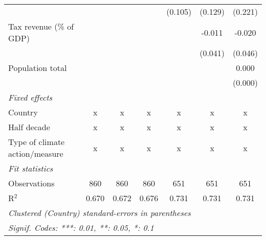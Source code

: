\begin{tabular}{lcccccc}
                                                          &         &              &                & (0.105)        & (0.129)        & (0.221)\\   
   Tax revenue (\% of GDP)                                &         &              &                &                & -0.011         & -0.020\\   
                                                          &         &              &                &                & (0.041)        & (0.046)\\   
   Population total                                       &         &              &                &                &                & 0.000\\   
                                                          &         &              &                &                &                & (0.000)\\   
   \emph{Fixed effects}\\
   Country                                                & x       & x            & x              & x              & x              & x\\  
   Half decade                                            & x       & x            & x              & x              & x              & x\\  
   Type of climate action/measure                         & x       & x            & x              & x              & x              & x\\  
   \midrule \emph{Fit statistics}\\
   Observations                                           & 860     & 860          & 860            & 651            & 651            & 651\\  
   R$^2$                                                  & 0.670   & 0.672        & 0.676          & 0.731          & 0.731          & 0.731\\  
   \midrule
   \multicolumn{7}{l}{\emph{Clustered (Country) standard-errors in parentheses}}\\
   \multicolumn{7}{l}{\emph{Signif. Codes: ***: 0.01, **: 0.05, *: 0.1}}\\
\end{tabular}
\par\endgroup


